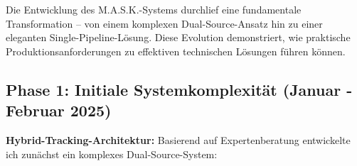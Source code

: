 Die Entwicklung des M.A.S.K.-Systems durchlief eine fundamentale Transformation – von einem komplexen Dual-Source-Ansatz hin zu einer eleganten Single-Pipeline-Lösung. Diese Evolution demonstriert, wie praktische Produktionsanforderungen zu effektiven technischen Lösungen führen können.

\subsection{Phase 1: Initiale Systemkomplexität (Januar - Februar 2025)}

\textbf{Hybrid-Tracking-Architektur:}
Basierend auf Expertenberatung entwickelte ich zunächst ein komplexes Dual-Source-System:

\begin{figure}[htbp]
    \centering
\end{figure}
